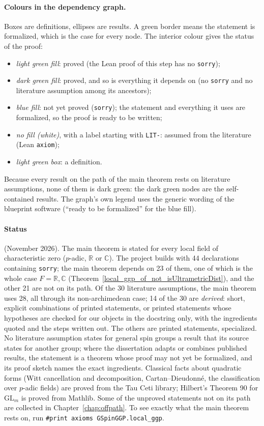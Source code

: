 \paragraph{Colours in the dependency graph.}
Boxes are definitions, ellipses are results. A green border means the statement is formalized,
which is the case for every node. The interior colour gives the status of the proof:
\begin{itemize}
  \item \emph{light green fill}: proved (the Lean proof of this step has no \texttt{sorry});
  \item \emph{dark green fill}: proved, and so is everything it depends on (no \texttt{sorry} and no
    literature assumption among its ancestors);
  \item \emph{blue fill}: not yet proved (\texttt{sorry}); the statement and everything it uses are
    formalized, so the proof is ready to be written;
  \item \emph{no fill (white)}, with a label starting with \texttt{LIT-}: assumed from the literature
    (Lean \texttt{axiom});
  \item \emph{light green box}: a definition.
\end{itemize}
Because every result on the path of the main theorem rests on literature assumptions, none of them is
dark green: the dark green nodes are the self-contained results. The graph's own legend uses the
generic wording of the blueprint software (``ready to be formalized'' for the blue fill).

\paragraph{Status} (November 2026). The main theorem is stated for every local field of
characteristic zero ($p$-adic, $\mathbb R$ or $\mathbb C$). The project builds with 44 declarations
containing \texttt{sorry}; the main theorem depends on 23 of them, one of which is the whole case
$F=\mathbb R,\mathbb C$ (Theorem~\ref{local_ggp_of_not_isUltrametricDist}), and the other 21 are not on
its path. Of the 30 literature assumptions, the main theorem uses 28, all through its non-archimedean
case; 14 of the 30 are \emph{derived}: short, explicit combinations of printed statements, or printed
statements whose hypotheses are checked for our objects in the docstring only, with the ingredients
quoted and the steps written out. The others are printed statements, specialized. No literature
assumption states for general spin groups a result that its source states for another group; where the
dissertation adapts or combines published results, the statement is a theorem whose proof may not yet
be formalized, and its proof sketch names the exact ingredients.
Classical facts about quadratic forms (Witt cancellation and decomposition, Cartan--Dieudonn\'e,
the classification over $p$-adic fields) are proved from the Tau Ceti library; Hilbert's Theorem 90
for $\mathrm{GL}_m$ is proved from Mathlib.
Some of the unproved statements not on its path are collected in Chapter~\ref{chap:offpath}. To see
exactly what the main theorem rests on, run \texttt{\#print axioms GSpinGGP.local\_ggp}.

